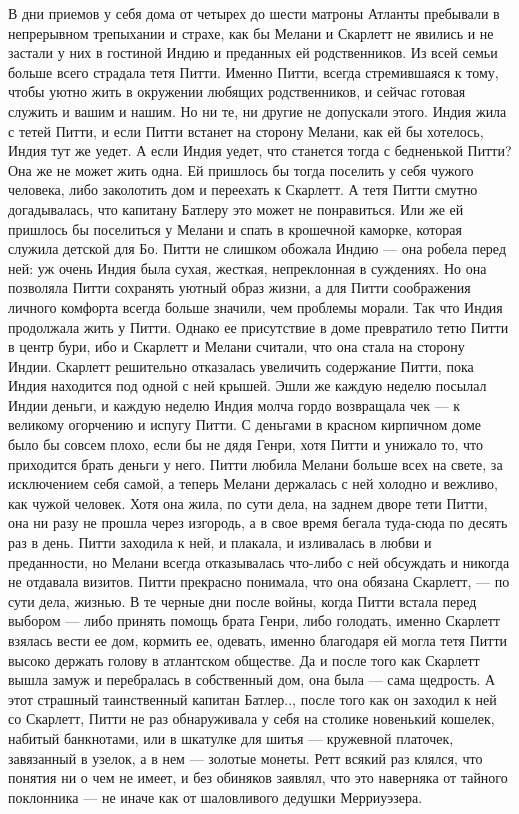 В дни приемов у себя дома от четырех до шести матроны Атланты пребывали в непрерывном трепыхании и страхе, как бы Мелани и Скарлетт не явились и не застали у них в гостиной Индию и преданных ей родственников. Из всей семьи больше всего страдала тетя Питти. Именно Питти, всегда стремившаяся к тому, чтобы уютно жить в окружении любящих родственников, и сейчас готовая служить и вашим и нашим. Но ни те, ни другие не допускали этого.
Индия жила с тетей Питти, и если Питти встанет на сторону Мелани, как ей бы хотелось, Индия тут же уедет. А если Индия уедет, что станется тогда с бедненькой Питти? Она же не может жить одна. Ей пришлось бы тогда поселить у себя чужого человека, либо заколотить дом и переехать к Скарлетт. А тетя Питти смутно догадывалась, что капитану Батлеру это может не понравиться. Или же ей пришлось бы поселиться у Мелани и спать в крошечной каморке, которая служила детской для Бо.
Питти не слишком обожала Индию — она робела перед ней: уж очень Индия была сухая, жесткая, непреклонная в суждениях. Но она позволяла Питти сохранять уютный образ жизни, а для Питти соображения личного комфорта всегда больше значили, чем проблемы морали. Так что Индия продолжала жить у Питти.
Однако ее присутствие в доме превратило тетю Питти в центр бури, ибо и Скарлетт и Мелани считали, что она стала на сторону Индии. Скарлетт решительно отказалась увеличить содержание Питти, пока Индия находится под одной с ней крышей. Эшли же каждую неделю посылал Индии деньги, и каждую неделю Индия молча гордо возвращала чек — к великому огорчению и испугу Питти. С деньгами в красном кирпичном доме было бы совсем плохо, если бы не дядя Генри, хотя Питти и унижало то, что приходится брать деньги у него.
Питти любила Мелани больше всех на свете, за исключением себя самой, а теперь Мелани держалась с ней холодно и вежливо, как чужой человек. Хотя она жила, по сути дела, на заднем дворе тети Питти, она ни разу не прошла через изгородь, а в свое время бегала туда-сюда по десять раз в день. Питти заходила к ней, и плакала, и изливалась в любви и преданности, но Мелани всегда отказывалась что-либо с ней обсуждать и никогда не отдавала визитов. Питти прекрасно понимала, что она обязана Скарлетт, — по сути дела, жизнью. В те черные дни после войны, когда Питти встала перед выбором — либо принять помощь брата Генри, либо голодать, именно Скарлетт взялась вести ее дом, кормить ее, одевать, именно благодаря ей могла тетя Питти высоко держать голову в атлантском обществе. Да и после того как Скарлетт вышла замуж и перебралась в собственный дом, она была — сама щедрость. А этот страшный таинственный капитан Батлер.., после того как он заходил к ней со Скарлетт, Питти не раз обнаруживала у себя на столике новенький кошелек, набитый банкнотами, или в шкатулке для шитья — кружевной платочек, завязанный в узелок, а в нем — золотые монеты. Ретт всякий раз клялся, что понятия ни о чем не имеет, и без обиняков заявлял, что это наверняка от тайного поклонника — не иначе как от шаловливого дедушки Мерриуэзера.
